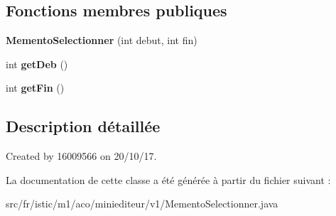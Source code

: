 \subsection*{Fonctions membres publiques}
\begin{DoxyCompactItemize}
\item 
\mbox{\label{classfr_1_1istic_1_1m1_1_1aco_1_1miniediteur_1_1v1_1_1MementoSelectionner_a060ba628c123b1de2d5a4ab0afce96fb}} 
{\bfseries Memento\+Selectionner} (int debut, int fin)
\item 
\mbox{\label{classfr_1_1istic_1_1m1_1_1aco_1_1miniediteur_1_1v1_1_1MementoSelectionner_aa1ce7afca63236c0e5e9730989238871}} 
int {\bfseries get\+Deb} ()
\item 
\mbox{\label{classfr_1_1istic_1_1m1_1_1aco_1_1miniediteur_1_1v1_1_1MementoSelectionner_acb03cb0b6bb4d368379ea46089b16c5f}} 
int {\bfseries get\+Fin} ()
\end{DoxyCompactItemize}


\subsection{Description détaillée}
Created by 16009566 on 20/10/17. 

La documentation de cette classe a été générée à partir du fichier suivant \+:\begin{DoxyCompactItemize}
\item 
src/fr/istic/m1/aco/miniediteur/v1/Memento\+Selectionner.\+java\end{DoxyCompactItemize}
